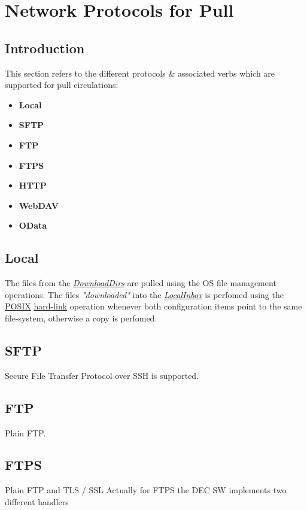 \documentclass[dec_sum_main.tex]{subfiles}
\begin{document}
\section{Network Protocols for Pull}

\subsection{Introduction}
This section refers to the different protocols \& associated verbs which are supported for pull circulations:

\begin{itemize}
	\item \textbf{Local}
	\item \textbf{SFTP}
	\item \textbf{FTP}
	\item \textbf{FTPS}
	\item \textbf{HTTP}
	\item \textbf{WebDAV}
	\item \textbf{OData}
\end{itemize}

\subsection{Local}
The files from the \hyperref[DownloadDirs]{\textit{DownloadDirs}} are 
pulled using the OS file management operations. 
The files \textit{"downloaded"} into the \hyperref[LocalInbox]{\textit{LocalInbox}} is perfomed using the \hyperlink{https://en.wikipedia.org/wiki/POSIX}{POSIX} \hyperlink{https://en.wikipedia.org/wiki/Hard_link}{hard-link} operation whenever both configuration items point to the same file-system, otherwise a copy is perfomed.


\subsection{SFTP}
Secure File Transfer Protocol over SSH is supported.

\subsection{FTP}
Plain FTP.

\subsection{FTPS}
Plain FTP and TLS / SSL Actually for FTPS the DEC SW implements two different handlers
\end{document}
